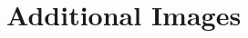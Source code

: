 \documentclass[10pt,twocolumn,letterpaper]{article}
\begin{document}
\clearpage
\twocolumn

\section{Additional Images}



\end{document}
